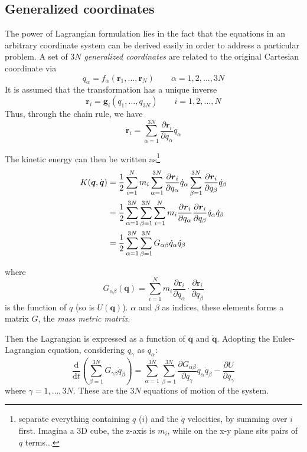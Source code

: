 \documentclass[
  10pt,
  twoside,
  openany,
  b5paper, %
  colorscheme = bootstrap-v4, %
]{qyxf-book}
\newcommand{\der}[2]{\dfrac{\md #1}{\md #2}}
\newcommand{\p}[2]{\dfrac{\partial #1}{\partial #2}}
\newcommand{\md}{\mathrm{d}}
\newcommand{\vr}{\boldsymbol{r}}
\newcommand{\vq}{\boldsymbol{q}}
\newcommand{\dvr}{\dot{\vr}}
\newcommand{\dvq}{\dot{\vq}}
\newcommand{\half}{\dfrac{1}{2}}
\newcommand{\sumin}{\sum_{i=1}^N}
\newcommand{\suman}{\sum_{\alpha=1}^{3N}}
\begin{document}
\subsection{Generalized coordinates}
The power of Lagrangian formulation lies in the fact that the equations in an arbitrary coordinate system can be derived easily in order to address a particular problem. A set of $3N$ \textit{generalized coordinates} are related to the original Cartesian coordinate via
\begin{equation}
	q_\alpha = f_\alpha(\vr_1,\dots,\vr_N)\qquad \alpha=1,2,\dots,3N
\end{equation}
It is assumed that the transformation has a unique inverse
\begin{equation}
	\vr_i=\boldsymbol{g}_i(q_1,\dots,q_{3N})\qquad i=1,2,\dots,N
\end{equation}
Thus, through the chain rule, we have
\begin{equation}
	\dvr_i=\suman\p{\vr_i}{q_\alpha}\dot{q}_\alpha
\end{equation}

The kinetic energy can then be written as\footnote{separate everything containing $q$ ($i$) and the $\dot{q}$ velocities, by summing over $i$ first. Imagina a 3D cube, the z-axis is $m_i$, while on the x-y plane sits pairs of $q$ terms...}
\begin{align}\label{eq:kinetic-energy}
	K(\vq,\dvq)&=\half\sumin m_i\suman\p{\vr_i}{q_\alpha}\dot{q}_\alpha\sum_{\beta=1}^{3N}\p{\vr_i}{q_\beta}\dot{q}_\beta \notag\\
	&=\half\suman\sum_{\beta=1}^{3N}\sumin m_i\p{\vr_i}{q_\alpha}\p{\vr_i}{q_\beta}\dot{q}_\alpha\dot{q}_\beta \notag\\
	&=\half\suman\sum_{\beta=1}^{3N}G_{\alpha\beta}\dot{q}_\alpha\dot{q}_\beta
\end{align}
\begin{tcolorbox}
	where
	\begin{equation}
		G_{\alpha\beta}(\vq)=\sumin m_i\p{\vr_i}{q_\alpha}\cdot\p{\vr_i}{q_\beta}
	\end{equation}
	is the function of $q$ (so is $U(\vq)$). $\alpha$ and $\beta$ as indices, these elements forms a matrix $G$, the \textit{mass metric matrix}. 
\end{tcolorbox}
Then the Lagrangian is expressed as a function of $\vq$ and $\dvq$. Adopting the Euler-Lagrangian equation, considering $q_{\gamma}$ as $q_\alpha$:
\begin{equation}
	\der{}{t}\left(\sum_{\beta=1}^{3N}G_{\gamma\beta}\dot{q}_\beta\right)=\suman\sum_{\beta=1}^{3N}\p{G_{\alpha\beta}}{q_\gamma}\dot{q}_\alpha\dot{q}_\beta-\p{U}{q_\gamma} \label{eq:lag-equations}
\end{equation}
where $\gamma=1,\dots,3N$. These are the $3N$ equations of motion of the system.
\end{document}
